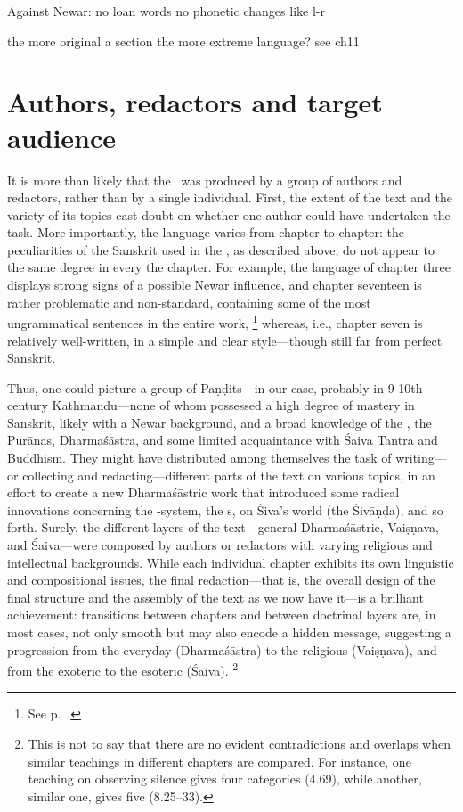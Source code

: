 Against Newar: no loan words no phonetic changes like l-r

\CHECK the more original a section the more extreme language? see ch11



\section{Authors, redactors and target audience}

It is more than likely that the \VSS\ was produced by a group 
of authors and redactors, rather than by a single individual. 
First, the extent of the text and the variety of its topics
cast doubt on whether one author could have undertaken the task.
More importantly, the language varies from chapter to chapter:
the peculiarities of the Sanskrit used in the \VSS, as described above,
do not appear to the same degree in every the chapter. 
For example, the language of chapter three displays strong signs
of a possible Newar influence, and
chapter seventeen is rather problematic and non-standard,
containing some of the most ungrammatical sentences in the entire work,%
               \footnote{See p.~\pageref{extremelanguage}.}
whereas, i.e., chapter seven is relatively well-written, in a simple and 
clear style---though still far from perfect Sanskrit.

        Thus, one could picture a group of Paṇḍits---in our case, probably in 
9-10th-century Kathmandu---none of whom possessed a high degree of mastery
in Sanskrit, likely with a Newar background, and a broad knowledge
of the \MBh, the Purāṇas, Dharmaśāstra, and some limited acquaintance
with Śaiva Tantra and Buddhism.
        They might have distributed among themselves the task of writing---or
collecting and redacting---different 
parts of the text on various topics, in an effort to create 
a new Dharmaśāstric work that introduced some radical innovations concerning the
-system, the s, on Śiva's world (the Śivāṇḍa), and so forth.
Surely, the different layers of the text---general Dharmaśāstric, Vaiṣṇava,
and Śaiva---were composed by authors or redactors with varying
religious and intellectual backgrounds. 
        While each individual chapter exhibits its own linguistic and compositional issues,
the final redaction---that is, the overall design of the final structure and
the assembly of the text as we now have it---is a brilliant achievement:
transitions between chapters and between doctrinal layers
are, in most cases, not only smooth but may also
encode a hidden message, suggesting a progression from the 
everyday (Dharmaśāstra) to the religious (Vaiṣṇava), 
and from the exoteric to the esoteric (Śaiva).%
        \footnote{This is not to say that there are no evident
                  contradictions and overlaps when similar teachings in different
                  chapters are compared. For instance, one teaching
                  on observing silence  gives four categories
                  (4.69), while another, similar one, gives five (8.25--33).}

